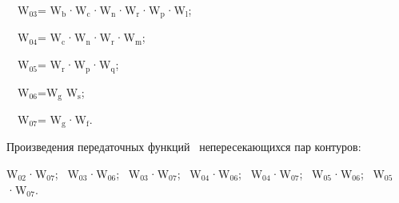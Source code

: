 \documentclass[a4paper]{article}
\newcommand\textsubscript[1]{\ensuremath{{}_{\text{#1}}}}
\begin{document}
{\begin{russian}\sffamily
\textenglish{\ \ W}\textenglish{\textsubscript{03}}\textenglish{=
W}\textenglish{\textsubscript{b}}·\textenglish{W}\textenglish{\textsubscript{c}}·\textenglish{W}\textenglish{\textsubscript{n}}·\textenglish{W}\textenglish{\textsubscript{r}}·\textenglish{W}\textenglish{\textsubscript{p}}·\textenglish{W}\textenglish{\textsubscript{l}}\textenglish{;}
\end{russian}}

{\begin{russian}\sffamily
\textenglish{\ \ W}\textenglish{\textsubscript{04}}\textenglish{=
W}\textenglish{\textsubscript{c}}·\textenglish{W}\textenglish{\textsubscript{n}}·\textenglish{W}\textenglish{\textsubscript{r}}·\textenglish{W}\textenglish{\textsubscript{m}}\textenglish{;}
\end{russian}}

{\begin{russian}\sffamily
\textenglish{\ \ W}\textenglish{\textsubscript{05}}\textenglish{=
W}\textenglish{\textsubscript{r}}·\textenglish{W}\textenglish{\textsubscript{p}}·\textenglish{W}\textenglish{\textsubscript{q}}\textenglish{;}
\end{russian}}

{\begin{russian}\sffamily
\textenglish{\ \ W}\textenglish{\textsubscript{06}}\textenglish{=W}\textenglish{\textsubscript{g}}\textenglish{
W}\textenglish{\textsubscript{s}}\textenglish{;}
\end{russian}}

{\begin{russian}\sffamily
\textenglish{\ \ W}\textenglish{\textsubscript{07}}\textenglish{=
W}\textenglish{\textsubscript{g}}·\textenglish{W}\textenglish{\textsubscript{f}}\textenglish{.}
\end{russian}}


\bigskip

{\begin{russian}\sffamily
Произведения передаточных функций \ непересекающихся пар контуров:
\end{russian}}

{\begin{russian}\sffamily
W\textsubscript{02}·W\textsubscript{07}; \ W\textsubscript{03}·W\textsubscript{06};
\ W\textsubscript{03}·W\textsubscript{07}; \ W\textsubscript{04}·W\textsubscript{06};
\ W\textsubscript{04}·W\textsubscript{07}; \ W\textsubscript{05}·W\textsubscript{06};
\ W\textsubscript{05}·W\textsubscript{07}. 
\end{russian}}
\end{document}
